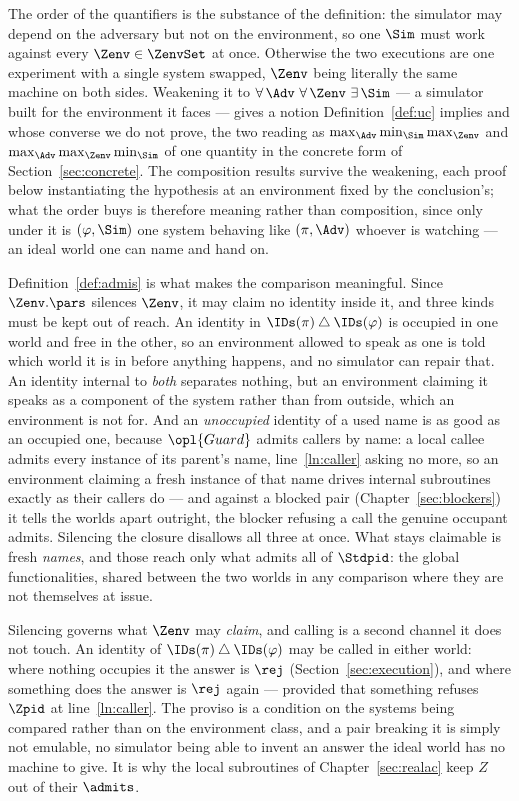 \documentclass[10pt,oneside,openany]{book}
\theoremstyle{accentdef}
\theoremstyle{accentplain}
\begin{document}
The order of the quantifiers is the substance of the definition: the simulator may depend on the
adversary but not on the environment, so one $\Sim$ must work against every $\Zenv \in \ZenvSet$
at once. Otherwise the two executions are one experiment with a single system swapped, $\Zenv$
being literally the same machine on both sides. Weakening it to
$\forall\, \Adv\ \forall\, \Zenv\ \exists\, \Sim$ --- a simulator built for the environment it
faces --- gives a notion Definition~\ref{def:uc} implies and whose converse we do not prove, the
two reading as $\max_\Adv \min_\Sim \max_\Zenv$ and $\max_\Adv \max_\Zenv \min_\Sim$ of one
quantity in the concrete form of Section~\ref{sec:concrete}. The composition results survive the
weakening, each proof below instantiating the hypothesis at an environment fixed by the
conclusion's; what the order buys is therefore meaning rather than composition, since only under it
is $(\varphi,\Sim)$ one system behaving like $(\pi,\Adv)$ whoever is watching --- an ideal world
one can name and hand on.

Definition~\ref{def:admis} is what makes the comparison meaningful. Since $\Zenv.\pars$ silences
$\Zenv$, it may claim no identity inside it, and three kinds must be kept out of reach. An identity
in $\IDs(\pi) \mathbin{\triangle} \IDs(\varphi)$ is occupied in one world and free in the other, so
an environment allowed to speak as one is told which world it is in before anything happens, and
no simulator can repair that. An identity internal to \emph{both} separates nothing, but an
environment claiming it speaks as a component of the system rather than from outside, which an
environment is not for. And an \emph{unoccupied} identity of a used name is as good as an occupied
one, because $\opl{Guard}$ admits callers by name: a local callee admits every instance of its
parent's name, line~\ref{ln:caller} asking no more, so an environment claiming a fresh instance of
that name drives internal subroutines exactly as their callers do --- and against a blocked pair
(Chapter~\ref{sec:blockers}) it
tells the worlds apart outright, the blocker refusing a call the genuine occupant admits. Silencing
the closure disallows all three at once. What stays claimable is fresh \emph{names}, and those
reach only what admits all of $\Stdpid$: the global functionalities, shared between the two worlds in
any comparison where they are not themselves at issue.

Silencing governs what $\Zenv$ may \emph{claim}, and calling is a second channel it does not touch.
An identity of $\IDs(\pi) \mathbin{\triangle} \IDs(\varphi)$ may be called in either world: where
nothing occupies it the answer is $\rej$ (Section~\ref{sec:execution}), and where something does the
answer is $\rej$ again --- provided that something refuses $\Zpid$ at line~\ref{ln:caller}. The
proviso is a condition on the systems being compared rather than on the environment class, and a
pair breaking it is simply not emulable, no simulator being able to invent an answer the ideal world
has no machine to give. It is why the local subroutines of Chapter~\ref{sec:realac} keep $Z$ out of
their $\admits$.
\end{document}
